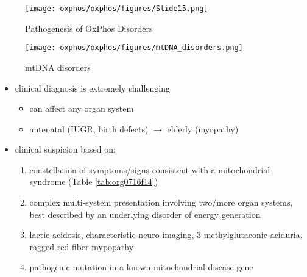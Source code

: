 \documentclass{scrartcl}
\begin{document}
\begin{figure}[htbp]
\centering
\texttt{[image: oxphos/oxphos/figures/Slide15.png]}
\caption[ETC]{\label{fig:org5d571ce}Pathogenesis of OxPhos Disorders}
\end{figure}


\begin{figure}[htbp]
\centering
\texttt{[image: oxphos/oxphos/figures/mtDNA\_disorders.png]}
\caption{\label{fig:orge8fb398}mtDNA disorders}
\end{figure}

\begin{itemize}
\item clinical diagnosis is extremely challenging
\begin{itemize}
\item can affect any organ system
\item antenatal (IUGR, birth defects) \(\to\) elderly (myopathy)
\end{itemize}

\item clinical suspicion based on:
\begin{enumerate}
\item constellation of symptoms/signs consistent with a mitochondrial syndrome (Table \ref{tab:org0716f14})
\item complex multi-system presentation involving two/more organ systems,
best described by an underlying disorder of energy generation
\item lactic acidosis, characteristic neuro-imaging, 3-methylglutaconic
aciduria, ragged red fiber mypopathy
\item pathogenic mutation in a known mitochondrial disease gene
\end{enumerate}
\end{itemize}
\end{document}
